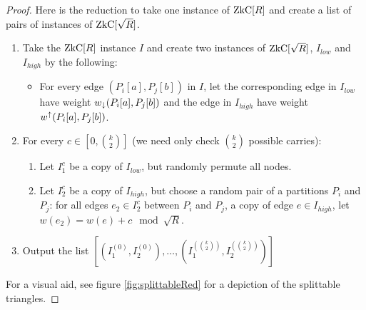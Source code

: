 \begin{proof}
	\newcommand{\lowI}{I_{low}}
	\newcommand{\highI}{I_{high}}
	Here is the reduction to take one instance of $\ZkC[R]$ and create a list of pairs of instances of $\ZkC[\sqrt R]$.
	\begin{enumerate}
		\item Take the $\ZkC[R]$ instance $I$ and create two instances of $\ZkC[\sqrt R]$, $\lowI$ and $\highI$ by the following:
		\begin{itemize}
			\item For every edge $(P_i[a], P_j[b])$ in $I$, let the corresponding edge in $\lowI$ have weight ${w}_\downarrow(P_i[a], P_j[b])$ and the edge in $\highI$ have weight ${w}^\uparrow(P_i[a], P_j[b])$.
		\end{itemize}
		\item For every $c \in [0,\binom k 2]$ (we need only check $\binom k 2$ possible carries):%
		\begin{enumerate}
			\item Let $I_1^{c}$ be a copy of $\lowI$, but randomly permute all nodes.
			\item Let $I_2^{c}$ be a copy of $\highI$, but choose a random pair of a partitions $P_i$ and $P_j$: for all edges $e_2 \in I_2^{c}$ between $P_i$ and $P_j$, a copy of edge $e \in \highI$, let $w(e_2) = w(e) + c \mod \sqrt R$.
		\end{enumerate}
		\item Output the list $[(I_1^{(0)}, I_2^{(0)}), \ldots, (I_1^{(\binom k 2)}, I_2^{(\binom k 2)})]$
	\end{enumerate}
	For a visual aid, see figure \ref{fig:splittableRed} for a depiction of the splittable triangles. 


\end{proof}
